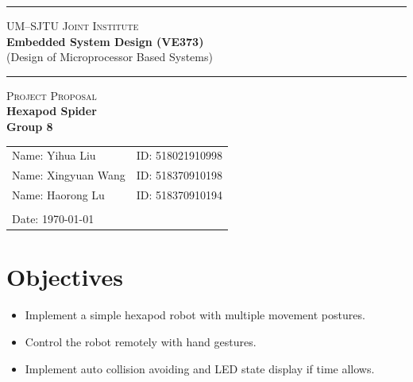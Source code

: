 \documentclass[a4paper]{article}
\begin{document}
\begin{titlepage}
    \vspace*{0.25cm}
    \noindent\rule[0.25\baselineskip]{\textwidth}{1pt}
    \begin{center}
        \huge{\textsc{UM--SJTU Joint Institute}}\vspace{0.3em}\\
        \huge{\textbf{Embedded System Design (VE373)}}\vspace{0.3em}\\
        \Large{(Design of Microprocessor Based Systems)}
        \noindent\rule[0.25\baselineskip]{\textwidth}{1pt}
    \end{center}
    \begin{center}
        \vspace{5cm}
        \Large{\textsc{Project Proposal}}\vspace{0.5em}\\
        \Large{\textbf{Hexapod Spider}}\vspace{1em}\\
        \Large{\textbf{Group 8}}\\
    \end{center}
    \vfill
    \large
    \begin{tabular}{ll}
        Name: Yihua Liu \hspace*{2em}&ID: 518021910998\hspace*{2em}\\
        Name: Xingyuan Wang \hspace*{2em}&ID: 518370910198\hspace*{2em}\\
        Name: Haorong Lu \hspace*{2em}&ID: 518370910194\hspace*{2em}\\
        \\
        Date: \today
    \end{tabular}
\end{titlepage}
\tableofcontents
\newpage
\section{Objectives}
\begin{itemize}
    \item Implement a simple hexapod robot with multiple movement postures.
    \item Control the robot remotely with hand gestures.
    \item Implement auto collision avoiding and LED state display if time allows.
\end{itemize}
\end{document}
